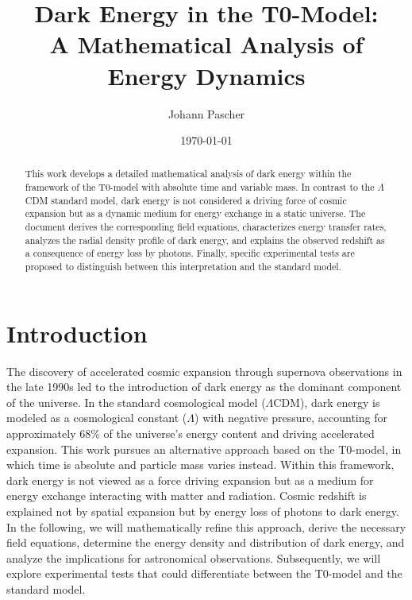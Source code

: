 \documentclass[a4paper,12pt]{article}
\theoremstyle{definition}
\theoremstyle{remark}
\begin{document}
	
	\title{Dark Energy in the T0-Model: \\A Mathematical Analysis of Energy Dynamics} %
	\author{Johann Pascher}
	\date{\today}
	\maketitle
	
	\begin{abstract}
		This work develops a detailed mathematical analysis of dark energy within the framework of the T0-model with absolute time and variable mass. In contrast to the \(\Lambda\)CDM standard model, dark energy is not considered a driving force of cosmic expansion but as a dynamic medium for energy exchange in a static universe. The document derives the corresponding field equations, characterizes energy transfer rates, analyzes the radial density profile of dark energy, and explains the observed redshift as a consequence of energy loss by photons. Finally, specific experimental tests are proposed to distinguish between this interpretation and the standard model.
	\end{abstract}
	
	\tableofcontents
	\newpage
	
	\section{Introduction}
	
	The discovery of accelerated cosmic expansion through supernova observations in the late 1990s led to the introduction of dark energy as the dominant component of the universe. In the standard cosmological model (\(\Lambda\)CDM), dark energy is modeled as a cosmological constant (\(\Lambda\)) with negative pressure, accounting for approximately 68\% of the universe's energy content and driving accelerated expansion. This work pursues an alternative approach based on the T0-model, in which time is absolute and particle mass varies instead. Within this framework, dark energy is not viewed as a force driving expansion but as a medium for energy exchange interacting with matter and radiation. Cosmic redshift is explained not by spatial expansion but by energy loss of photons to dark energy. In the following, we will mathematically refine this approach, derive the necessary field equations, determine the energy density and distribution of dark energy, and analyze the implications for astronomical observations. Subsequently, we will explore experimental tests that could differentiate between the T0-model and the standard model.
	
\end{document}
